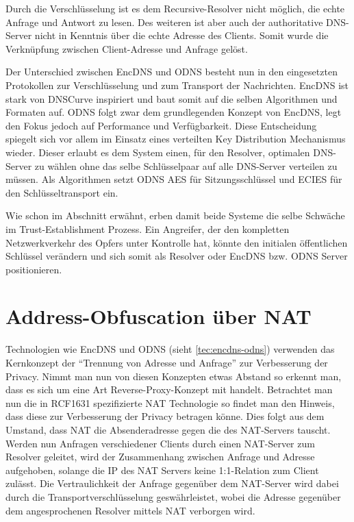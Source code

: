 Durch die Verschlüsselung ist es dem Recursive-Resolver nicht möglich, die echte Anfrage und Antwort zu lesen. Des weiteren ist aber auch der authoritative DNS-Server nicht in Kenntnis über die echte Adresse des Clients. Somit wurde die Verknüpfung zwischen Client-Adresse und Anfrage gelöst.

Der Unterschied zwischen EncDNS und ODNS besteht nun in den eingesetzten Protokollen zur Verschlüsselung und zum Transport der Nachrichten. EncDNS ist stark von DNSCurve inspiriert und baut somit auf die selben Algorithmen und Formaten auf. ODNS folgt zwar dem grundlegenden Konzept von EncDNS, legt den Fokus jedoch auf Performance und Verfügbarkeit. Diese Entscheidung spiegelt sich vor allem im Einsatz eines verteilten Key Distribution Mechanismus wieder. Dieser erlaubt es dem System einen, für den Resolver, optimalen DNS-Server zu wählen ohne das selbe Schlüsselpaar auf alle DNS-Server verteilen zu müssen. Als Algorithmen setzt ODNS AES für Sitzungsschlüssel und ECIES für den Schlüsseltransport ein.

Wie schon im Abschnitt  erwähnt, erben damit beide Systeme die selbe Schwäche im Trust-Establishment Prozess. Ein Angreifer, der den kompletten Netzwerkverkehr des Opfers unter Kontrolle hat, könnte den initialen öffentlichen Schlüssel verändern und sich somit als Resolver oder EncDNS bzw. ODNS Server positionieren.

\section{Address-Obfuscation über NAT}
\label{sec:tec-nat}
Technologien wie EncDNS und \ac{ODNS} (sieht \ref{tec:encdns-odns}) verwenden das Kernkonzept der ``Trennung von Adresse und Anfrage'' zur Verbesserung der Privacy. Nimmt man nun von diesen Konzepten etwas Abstand so erkennt man, dass es sich um eine Art Reverse-Proxy-Konzept mit handelt. Betrachtet man nun die in RCF1631\cite{rfc1631} spezifizierte \ac{NAT} Technologie so findet man den Hinweis, dass diese zur Verbesserung der Privacy betragen könne. Dies folgt aus dem Umstand, dass NAT die Absenderadresse gegen die des NAT-Servers tauscht. Werden nun Anfragen verschiedener Clients durch einen NAT-Server zum Resolver geleitet, wird der Zusammenhang zwischen Anfrage und Adresse aufgehoben, solange die IP des NAT Servers keine 1:1-Relation zum Client zulässt. Die Vertraulichkeit der Anfrage gegenüber dem NAT-Server wird dabei durch die Transportverschlüsselung geswährleistet, wobei die Adresse gegenüber dem angesprochenen Resolver mittels NAT verborgen wird.

